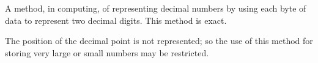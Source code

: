A method, in computing, of representing decimal numbers
by using each byte of data to represent two decimal digits.
This method is exact.
\par
The position of the
decimal point is not represented; so the use of this
method for storing very large or small numbers may be restricted.
